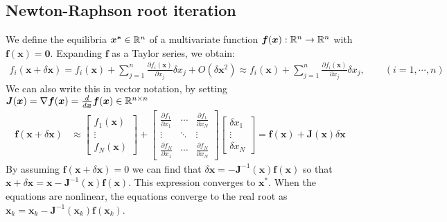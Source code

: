 \subsection{Newton-Raphson root iteration} \label{app:NewtonRaphson}
We define the equilibria $\boldsymbol{x^\ast} \in {\mathbb{R}}^n$ of a multivariate function $\boldsymbol{f}(\boldsymbol{x}) : {\mathbb{R}}^n \rightarrow {\mathbb{R}}^n$ with $\boldsymbol{f}(\boldsymbol{x}) = \boldsymbol{0}$. Expanding $\boldsymbol{f}$ as a Taylor series, we obtain:
\begin{align*}
f_i(\boldsymbol{x} + \delta \boldsymbol{x}) =f_{i}(\boldsymbol{x}) + \sum_{j=1}^{n} \frac{\partial f_{i}(\boldsymbol{x})}{\partial x_{j}} \delta x_{j}+O\left(\delta \boldsymbol{x}^{2}\right) \approx f_{i}(\boldsymbol{x})+\sum_{j=1}^{n} \frac{\partial f_{i}(\boldsymbol{x})}{\partial x_{j}} \delta x_{j}, \qquad (i=1, \cdots, n)
\end{align*}
We can also write this in vector notation, by setting $\boldsymbol{J}(\boldsymbol{x}) = \nabla \boldsymbol{f}(\boldsymbol{x}) = \frac{d}{d\boldsymbol{x}} \boldsymbol{f}(\boldsymbol{x}) \in {\mathbb{R}}^{n \times n}$ 
\begin{align*}
\boldsymbol{f}(\boldsymbol{x}+\delta \boldsymbol{x}) &\approx\left[\begin{array}{c}f_{1}(\boldsymbol{x}) \\ \vdots \\ f_{N}(\boldsymbol{x})\end{array}\right] 
+ \left[\begin{array}{ccc}\frac{\partial f_{1}}{\partial x_{1}} & \cdots & \frac{\partial f_{1}}{\partial x_{N}} \\ \vdots & \ddots & \vdots \\ \frac{\partial f_{N}}{\partial x_{1}} & \cdots & \frac{\partial f_{N}}{\partial x_{N}}\end{array}\right]
\left[\begin{array}{c}\delta x_{1} \\ \vdots \\ \delta x_{N}\end{array}\right] 
=\boldsymbol{f}(\boldsymbol{x})+\boldsymbol{J}(\boldsymbol{x}) \delta \boldsymbol{x} 
\end{align*}
By assuming $\boldsymbol{f}(\boldsymbol{x}+\delta \boldsymbol{x}) = 0$ we can find that $\delta \boldsymbol{x} = -\boldsymbol{J}^{-1}( \boldsymbol{x}) \boldsymbol{f}(\boldsymbol{x})$ so that $\boldsymbol{x} + \delta \boldsymbol{x} =  \boldsymbol{x} - \boldsymbol{J}^{-1} (\boldsymbol{x}) \boldsymbol{f}(\boldsymbol{x})$. This expression converges to $\boldsymbol{x^\ast}$. When the equations are nonlinear, the equations converge to the real root as $\boldsymbol{x}_k =  \boldsymbol{x}_k - \boldsymbol{J}^{-1} ( \boldsymbol{x}_k)\boldsymbol{f}(\boldsymbol{x}_k)$.








